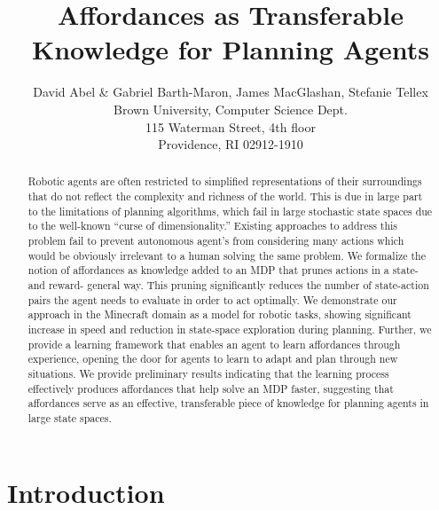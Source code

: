 \documentclass[letterpaper]{article}
\begin{document}

\title{Affordances as Transferable Knowledge for Planning Agents}
\author{David Abel \& Gabriel Barth-Maron, James MacGlashan, Stefanie Tellex\\
Brown University, Computer Science Dept. \\
115 Waterman Street, 4th floor \\
Providence, RI 02912-1910}


\maketitle
\begin{abstract}
Robotic agents are often restricted to simplified representations of their surroundings
that do not reflect the complexity and richness of the world. This is due in large part to the limitations
of planning algorithms, which fail in large stochastic state spaces due to the well-known ``curse of
dimensionality.'' Existing approaches to address this problem fail to
prevent autonomous agent's from considering many actions which would be
obviously irrelevant to a human solving the same problem. We formalize the notion of affordances
as knowledge added to an MDP that prunes actions in a state- and reward- general
way. This pruning significantly reduces the number of state-action
pairs the agent needs to evaluate in order to act optimally. We
demonstrate our approach in the Minecraft domain as a model for robotic tasks, showing significant
increase in speed and reduction in state-space exploration during planning. Further, we provide a
learning framework that enables an agent to learn affordances through
experience, opening the door for agents to learn to adapt and plan through new situations. We provide
preliminary results indicating that the learning process effectively
produces affordances that help solve an MDP faster, suggesting that affordances
serve as an effective, transferable piece of knowledge for planning agents in 
large state spaces.
\end{abstract}

\section{Introduction}
\label{sec:introduction}
\end{document}
